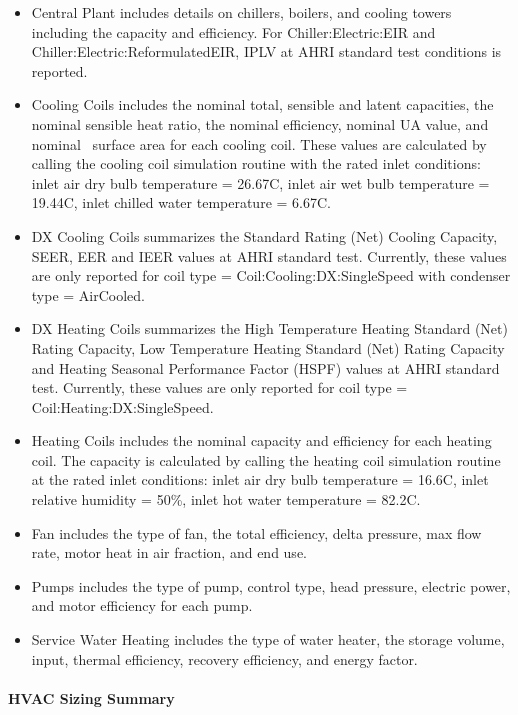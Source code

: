 \begin{itemize}
\item
  Central Plant includes details on chillers, boilers, and cooling towers including the capacity and efficiency. For Chiller:Electric:EIR and Chiller:Electric:ReformulatedEIR, IPLV at AHRI standard test conditions is reported.
\item
  Cooling Coils includes the nominal total, sensible and latent capacities, the nominal sensible heat ratio, the nominal efficiency, nominal UA value, and nominal~ surface area for each cooling coil. These values are calculated by calling the cooling coil simulation routine with the rated inlet conditions: inlet air dry bulb temperature = 26.67C, inlet air wet bulb temperature = 19.44C, inlet chilled water temperature = 6.67C.
\item
  DX Cooling Coils summarizes the Standard Rating (Net) Cooling Capacity, SEER, EER and IEER values at AHRI standard test. Currently, these values are only reported for coil type = Coil:Cooling:DX:SingleSpeed with condenser type = AirCooled.
\item
  DX Heating Coils summarizes the High Temperature Heating Standard (Net) Rating Capacity, Low Temperature Heating Standard (Net) Rating Capacity and Heating Seasonal Performance Factor (HSPF) values at AHRI standard test. Currently, these values are only reported for coil type = Coil:Heating:DX:SingleSpeed.
\item
  Heating Coils includes the nominal capacity and efficiency for each heating coil. The capacity is calculated by calling the heating coil simulation routine at the rated inlet conditions: inlet air dry bulb temperature = 16.6C, inlet relative humidity = 50\%, inlet hot water temperature = 82.2C.
\item
  Fan includes the type of fan, the total efficiency, delta pressure, max flow rate, motor heat in air fraction, and end use.
\item
  Pumps includes the type of pump, control type, head pressure, electric power, and motor efficiency for each pump.
\item
  Service Water Heating includes the type of water heater, the storage volume, input, thermal efficiency, recovery efficiency, and energy factor.
\end{itemize}

\paragraph{HVAC Sizing Summary}\label{hvac-sizing-summary}

